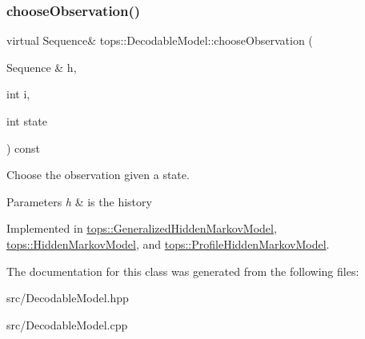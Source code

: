 \subsubsection{\texorpdfstring{choose\+Observation()}{chooseObservation()}}
{\footnotesize\ttfamily virtual Sequence\& tops\+::\+Decodable\+Model\+::choose\+Observation (\begin{DoxyParamCaption}\item[{Sequence \&}]{h,  }\item[{int}]{i,  }\item[{int}]{state }\end{DoxyParamCaption}) const\hspace{0.3cm}{\ttfamily [pure virtual]}}



Choose the observation given a state. 


\begin{DoxyParams}{Parameters}
{\em h} & is the history \\
\hline
\end{DoxyParams}


Implemented in \hyperlink{classtops_1_1GeneralizedHiddenMarkovModel_a233bb11a876558c449713e274f0f7f6c}{tops\+::\+Generalized\+Hidden\+Markov\+Model}, \hyperlink{classtops_1_1HiddenMarkovModel_af9085a6ee9df355a207b0090d2eae284}{tops\+::\+Hidden\+Markov\+Model}, and \hyperlink{classtops_1_1ProfileHiddenMarkovModel_a369bbe95930890c2460ee1b56b4415f5}{tops\+::\+Profile\+Hidden\+Markov\+Model}.



The documentation for this class was generated from the following files\+:\begin{DoxyCompactItemize}
\item 
src/Decodable\+Model.\+hpp\item 
src/Decodable\+Model.\+cpp\end{DoxyCompactItemize}
